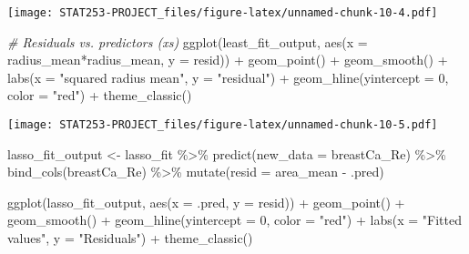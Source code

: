\documentclass[
]{article}
\newenvironment{Shaded}{\begin{snugshade}}{\end{snugshade}}
\newcommand{\AttributeTok}[1]{\textcolor[rgb]{0.77,0.63,0.00}{#1}}
\newcommand{\CommentTok}[1]{\textcolor[rgb]{0.56,0.35,0.01}{\textit{#1}}}
\newcommand{\DecValTok}[1]{\textcolor[rgb]{0.00,0.00,0.81}{#1}}
\newcommand{\FunctionTok}[1]{\textcolor[rgb]{0.00,0.00,0.00}{#1}}
\newcommand{\NormalTok}[1]{#1}
\newcommand{\OtherTok}[1]{\textcolor[rgb]{0.56,0.35,0.01}{#1}}
\newcommand{\SpecialCharTok}[1]{\textcolor[rgb]{0.00,0.00,0.00}{#1}}
\newcommand{\StringTok}[1]{\textcolor[rgb]{0.31,0.60,0.02}{#1}}
\begin{document}
\texttt{[image: STAT253-PROJECT\_files/figure-latex/unnamed-chunk-10-4.pdf]}

\begin{Shaded}
\begin{Highlighting}[]
\CommentTok{\# Residuals vs. predictors (x\textquotesingle{}s) }
\FunctionTok{ggplot}\NormalTok{(least\_fit\_output, }\FunctionTok{aes}\NormalTok{(}\AttributeTok{x =}\NormalTok{ radius\_mean}\SpecialCharTok{*}\NormalTok{radius\_mean, }\AttributeTok{y =}\NormalTok{ resid)) }\SpecialCharTok{+}
  \FunctionTok{geom\_point}\NormalTok{() }\SpecialCharTok{+}
  \FunctionTok{geom\_smooth}\NormalTok{() }\SpecialCharTok{+}
  \FunctionTok{labs}\NormalTok{(}\AttributeTok{x =} \StringTok{"squared radius mean"}\NormalTok{, }\AttributeTok{y =} \StringTok{"residual"}\NormalTok{) }\SpecialCharTok{+}
  \FunctionTok{geom\_hline}\NormalTok{(}\AttributeTok{yintercept =} \DecValTok{0}\NormalTok{, }\AttributeTok{color =} \StringTok{"red"}\NormalTok{) }\SpecialCharTok{+}
  \FunctionTok{theme\_classic}\NormalTok{()}
\end{Highlighting}
\end{Shaded}

\texttt{[image: STAT253-PROJECT\_files/figure-latex/unnamed-chunk-10-5.pdf]}

\begin{Shaded}
\begin{Highlighting}[]
\NormalTok{lasso\_fit\_output }\OtherTok{\textless{}{-}}\NormalTok{ lasso\_fit }\SpecialCharTok{\%\textgreater{}\%}
  \FunctionTok{predict}\NormalTok{(}\AttributeTok{new\_data =}\NormalTok{ breastCa\_Re) }\SpecialCharTok{\%\textgreater{}\%}
  \FunctionTok{bind\_cols}\NormalTok{(breastCa\_Re) }\SpecialCharTok{\%\textgreater{}\%}
  \FunctionTok{mutate}\NormalTok{(}\AttributeTok{resid =}\NormalTok{ area\_mean }\SpecialCharTok{{-}}\NormalTok{ .pred)}

\FunctionTok{ggplot}\NormalTok{(lasso\_fit\_output, }\FunctionTok{aes}\NormalTok{(}\AttributeTok{x =}\NormalTok{ .pred, }\AttributeTok{y =}\NormalTok{ resid)) }\SpecialCharTok{+}
  \FunctionTok{geom\_point}\NormalTok{() }\SpecialCharTok{+}
  \FunctionTok{geom\_smooth}\NormalTok{() }\SpecialCharTok{+}
  \FunctionTok{geom\_hline}\NormalTok{(}\AttributeTok{yintercept =} \DecValTok{0}\NormalTok{, }\AttributeTok{color =} \StringTok{"red"}\NormalTok{) }\SpecialCharTok{+}
  \FunctionTok{labs}\NormalTok{(}\AttributeTok{x =} \StringTok{"Fitted values"}\NormalTok{, }\AttributeTok{y =} \StringTok{"Residuals"}\NormalTok{) }\SpecialCharTok{+}
  \FunctionTok{theme\_classic}\NormalTok{()}
\end{Highlighting}
\end{Shaded}
\end{document}
